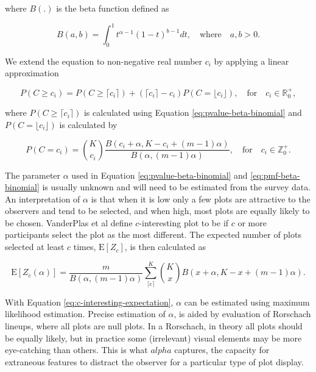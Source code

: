 \documentclass[]{interact}
\theoremstyle{plain}%
\theoremstyle{definition}
\theoremstyle{remark}
\begin{document}
\noindent where \(B(.)\) is the beta function defined as

\begin{equation} \label{eq:betafunction}
B(a, b) = \int_{0}^{1}t^{\alpha - 1}(1-t)^{b-1}dt,\quad \text{where}\quad a,b>0.
\end{equation}

\noindent We extend the equation to non-negative real number \(c_i\) by
applying a linear approximation

\begin{equation} \label{eq:pvalue-beta-binomial-approx}
P(C \geq c_i) = P(C \geq \lceil c_i \rceil) + (\lceil c_i \rceil - c_i) P(C = \lfloor c_i \rfloor), \quad \text{for}\quad c_i \in \mathbb{R}_0^+,
\end{equation}

\noindent where \(P(C \geq \lceil c_i \rceil)\) is calculated using
Equation \ref{eq:pvalue-beta-binomial} and
\(P(C = \lfloor c_i \rfloor)\) is calculated by

\begin{equation} \label{eq:pmf-beta-binomial}
P(C = c_i) = {K \choose c_i}\frac{B(c_i + \alpha, K - c_i + (m - 1)\alpha)}{B(\alpha, (m-1)\alpha)},\quad \text{for} \quad c_i \in \mathbb{Z}_0^+.
\end{equation}

The parameter \(\alpha\) used in Equation \ref{eq:pvalue-beta-binomial}
and \ref{eq:pmf-beta-binomial} is usually unknown and will need to be
estimated from the survey data. An interpretation of \(\alpha\) is that
when it is low only a few plots are attractive to the observers and tend
to be selected, and when high, most plots are equally likely to be
chosen. VanderPlas et al define \(c\)-interesting plot to be if \(c\) or
more participants select the plot as the most different. The expected
number of plots selected at least \(c\) times, \(\mathrm{E}[Z_c]\), is
then calculated as

\begin{equation} \label{eq:c-interesting-expectation}
\mathrm{E}[Z_c(\alpha)] = \frac{m}{B(\alpha, (m-1)\alpha)}\sum_{\lceil c \rceil}^{K}{K \choose x} B(x + \alpha, K - x + (m-1)\alpha).\end{equation}

With Equation \ref{eq:c-interesting-expectation}, \(\alpha\) can be
estimated using maximum likelihood estimation. Precise estimation of
\(\alpha\), is aided by evaluation of Rorschach lineups, where all plots
are null plots. In a Rorschach, in theory all plots should be equally
likely, but in practice some (irrelevant) visual elements may be more
eye-catching than others. This is what \(alpha\) captures, the capacity
for extraneous features to distract the observer for a particular type
of plot display.
\end{document}

